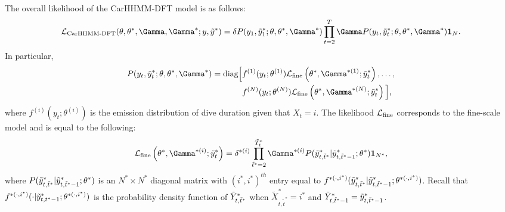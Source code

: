 The overall likelihood of the CarHHMM-DFT model is as follows:
%
$$\calL_{\text{CarHHMM-DFT}}(\theta,\theta^*,\Gamma,\Gamma^*;y,\z) = \delta P(y_1,\z_1;\theta,\theta^*,\Gamma^*) \prod_{t=2}^T \Gamma P(y_t,\z_t;\theta,\theta^*,\Gamma^*) \mathbf{1}_N.$$
%
In particular,
%
\begin{align*}
P(y_t,\z_t;\theta,\theta^*,\Gamma^*)  = \text{diag}\Big[&f^{(1)}(y_t;\theta^{(1)})\calL_{\text{fine}}\left(\theta^*,\Gamma^{*(1)};\z_t\right), \ldots , \\
&f^{(N)}(y_t;\theta^{(N)})\calL_{\text{fine}}\left(\theta^*,\Gamma^{*(N)};\z_t\right) \Big],
\end{align*}
%
where $f^{(i)}(y_t;\theta^{(i)})$ is the emission distribution of dive duration given that $X_t = i$. The likelihood $\mathcal{L}_{\text{fine}}$ corresponds to the fine-scale model and is equal to the following:
%
$$\calL_{\text{fine}}\left(\theta^{*},\Gamma^{*(i)};\z_t\right) = \delta^{*(i)} \prod_{\tilde t^* = 2}^{\tilde T^*_t} \Gamma^{*(i)} P(\z_{t,\tilde t^*}|\z_{t,\tilde t^*-1};\theta^*) \mathbf{1}_{N^*},$$
%
where $P(\tilde{y}^*_{t,\tilde t^*}|\tilde{y}^*_{t,\tilde t^*-1};\theta^*)$ is an $N^* \times N^*$ diagonal matrix with $(i^*,i^*)^{th}$ entry equal to $f^{*(\cdot,i^*)}(\tilde{y}^*_{t,\tilde t^*}|\tilde{y}^*_{t,\tilde t^*-1}; \theta^{*(\cdot,i^*)})$.
%
Recall that $f^{*(\cdot,i^*)}(\cdot|\tilde{y}^*_{t,t^*-1}; \theta^{*(\cdot,i^*)})$ is the probability density function of $\tilde{Y}^*_{t,\tilde t^*}$ when $\tilde X^*_{t,\tilde t^*} = i^*$ and $\tilde{Y}^*_{t,\tilde t^*-1} = \tilde{y}^*_{t,\tilde t^*-1}$.


